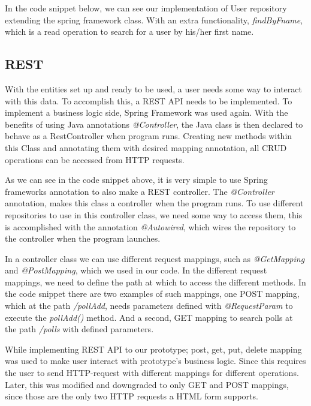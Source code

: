 In the code snippet below, we can see our implementation of User repository extending the spring framework class. With an extra functionality, \textit{findByFname}, which is a read operation to search for a user by his/her first name.



\subsection{REST}\label{sub:rest}
With the entities set up and ready to be used, a user needs some way to interact with this data. To accomplish this, a REST API needs to be implemented. To implement a business logic side, Spring Framework was used again. With the benefits of using Java annotations \textit{@Controller}, the Java class is then declared to behave as a RestController when program runs. Creating new methods within this Class and annotating them with desired mapping annotation, all CRUD operations can be accessed from HTTP requests.



As we can see in the code snippet above, it is very simple to use Spring frameworks annotation to also make a REST controller. The \textit{@Controller} annotation, makes this class a controller when the program runs. To use different repositories to use in this controller class, we need some way to access them, this is accomplished with the annotation \textit{@Autowired}, which wires the repository to the controller when the program launches.

In a controller class we can use different request mappings, such as \textit{@GetMapping} and \textit{@PostMapping}, which we used in our code. In the different request mappings, we need to define the path at which to access the different methods. In the code snippet there are two examples of such mappings, one POST mapping, which at the path \textit{/pollAdd}, needs parameters defined with \textit{@RequestParam} to execute the \textit{pollAdd()} method. And a second, GET mapping to search polls at the path \textit{/polls} with defined parameters.

While implementing REST API to our prototype; post, get, put, delete mapping was used to make user interact with prototype's business logic. Since this requires the user to send HTTP-request with different mappings for different operations. Later, this was modified and downgraded to only GET and POST mappings, since those are the only two HTTP requests a HTML form supports.

